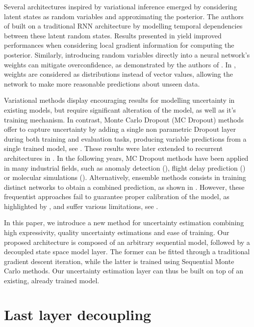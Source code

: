 \documentclass{article}
\begin{document}
Several architectures inspired by variational inference emerged by considering latent states as random variables and approximating the posterior.
The authors of \cite{Chung2015NIPS} built on a traditional RNN architecture by modelling temporal dependencies between these latent random states.
Results presented in \cite{Fortunato2017bayesian} yield improved performances when considering local gradient information for computing the posterior.
Similarly, introducing random variables directly into a neural network's weights can mitigate overconfidence, as demonstrated by the authors of \cite{Hinton1993}.
In \cite{Blundell2015}, weights are considered as distributions instead of vector values, allowing the network to make more reasonable predictions about unseen data.

Variational methods display encouraging results for modelling uncertainty in existing models, but require significant alteration of the model, as well as it's training mechanism.
In contrast, Monte Carlo Dropout (MC Dropout) methods offer to capture uncertainty by adding a single non parametric Dropout layer during both training and evaluation tasks, producing variable predictions from a single trained model, see \cite{Gal2016}.
These results were later extended to recurrent architectures in \cite{Gal2016NIPS}.
In the following years, MC Dropout methods have been applied in many industrial fields, such as anomaly detection (\cite{Zhu2017DeepAC}), flight delay prediction (\cite{Vandal2018}) or molecular simulations (\cite{Wen2020UncertaintyQI}).
Alternatively, ensemble methods consists in training distinct networks to obtain a combined prediction, as shown in \cite{Pearce2018}.
However, these frequentist approaches fail to guarantee proper calibration of the model, as highlighted by \cite{ashukha2020pitfalls}, and suffer various limitations, see \cite{Fong2020}.

In this paper, we introduce a new method for uncertainty estimation combining high expressivity, quality uncertainty estimations and ease of training.
Our proposed architecture is composed of an arbitrary sequential model, followed by a decoupled state space model layer.
The former can be fitted through a traditional gradient descent iteration, while the latter is trained using Sequential Monte Carlo methods.
Our uncertainty estimation layer can thus be built on top of an existing, already trained model.


\section{Last layer decoupling}
\label{sec:decoupling}
\end{document}
